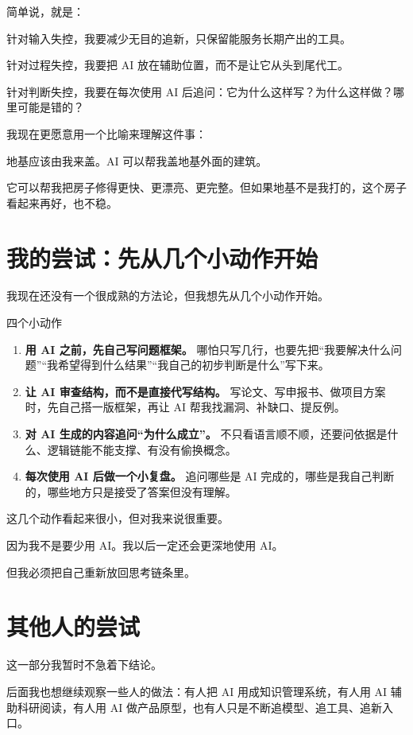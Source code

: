 \documentclass[UTF8,zihao=-4,a4paper]{ctexart}
\newcommand{\keyword}[1]{\textcolor{PrimaryDark}{\bfseries #1}}
\begin{document}
简单说，就是：

针对输入失控，我要减少无目的追新，只保留能服务长期产出的工具。\par
针对过程失控，我要把 AI 放在辅助位置，而不是让它从头到尾代工。\par
针对判断失控，我要在每次使用 AI 后追问：它为什么这样写？为什么这样做？哪里可能是错的？

我现在更愿意用一个比喻来理解这件事：

地基应该由我来盖。AI 可以帮我盖地基外面的建筑。

它可以帮我把房子修得更快、更漂亮、更完整。但如果地基不是我打的，这个房子看起来再好，也不稳。

\section{我的尝试：先从几个小动作开始}
我现在还没有一个很成熟的方法论，但我想先从几个小动作开始。

\begin{amberbox}{四个小动作}
\begin{enumerate}
  \item \keyword{用 AI 之前，先自己写问题框架。} 哪怕只写几行，也要先把“我要解决什么问题”“我希望得到什么结果”“我自己的初步判断是什么”写下来。
  \item \keyword{让 AI 审查结构，而不是直接代写结构。} 写论文、写申报书、做项目方案时，先自己搭一版框架，再让 AI 帮我找漏洞、补缺口、提反例。
  \item \keyword{对 AI 生成的内容追问“为什么成立”。} 不只看语言顺不顺，还要问依据是什么、逻辑链能不能支撑、有没有偷换概念。
  \item \keyword{每次使用 AI 后做一个小复盘。} 追问哪些是 AI 完成的，哪些是我自己判断的，哪些地方只是接受了答案但没有理解。
\end{enumerate}
\end{amberbox}

这几个动作看起来很小，但对我来说很重要。

因为我不是要少用 AI。我以后一定还会更深地使用 AI。

但我必须把自己重新放回思考链条里。

\section{其他人的尝试}
这一部分我暂时不急着下结论。

后面我也想继续观察一些人的做法：有人把 AI 用成知识管理系统，有人用 AI 辅助科研阅读，有人用 AI 做产品原型，也有人只是不断追模型、追工具、追新入口。
\end{document}
